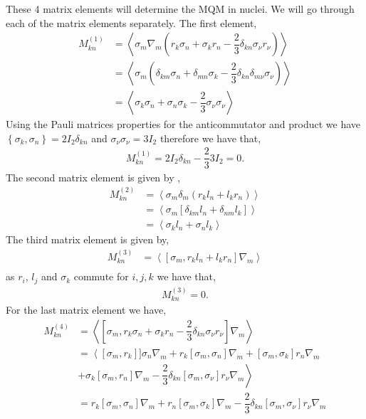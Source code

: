 \documentclass[10pt,a4paper, twoside]{report}
\begin{document}
These 4 matrix elements will determine the MQM in nuclei. We will go through each of the matrix elements separately. The first element,
\begin{align*}
M^{(1)}_{kn} &= \left<\sigma_m\nabla_m\left(r_k\sigma_n + \sigma_kr_n - \dfrac{2}{3}\delta_{kn}\sigma_\nu r_\nu\right)\right> \\
&= \left<\sigma_m\left(\delta_{km}\sigma_{n} + \delta_{mn}\sigma_k - \dfrac{2}{3}\delta_{kn}\delta_{m\nu}\sigma_{\nu}\right)\right> \\
&= \left<\sigma_k\sigma_n + \sigma_n\sigma_k - \dfrac{2}{3}\sigma_{\nu}\sigma_{\nu} \right>
\end{align*}
Using the Pauli matrices properties for the anticommutator and product we have $\left\{\sigma_k, \sigma_n\right\} = 2I_{2}\delta_{kn}$ and $\sigma_{\nu}\sigma_{\nu} = 3I_{2}$ therefore we have that,
\begin{align*}
M^{(1)}_{kn} = 2I_{2}\delta_{kn} - \dfrac{2}{3} 3I_{2} = 0.
\end{align*}
The second matrix element is given by ,
\begin{align*}
M^{(2)}_{kn} &= \left<\sigma_m\delta_m\left(r_kl_n + l_kr_n\right)\right> \\
 &= \left<\sigma_m \left[\delta_{km}l_n + \delta_{nm}l_k\right]\right> \\
&= \left<\sigma_k l_n + \sigma_nl_k\right>
\end{align*}
The third matrix element is given by,
\begin{align*}
M^{(3)}_{kn} &= \left<\left[\sigma_m, r_kl_n + l_kr_n\right]\nabla_m\right> \\
\end{align*}
as $r_i$, $l_{j}$ and $\sigma_k$ commute for $i,j,k$ we have that,
\begin{align*}
M^{(3)}_{kn} = 0.
\end{align*}
For the last matrix element we have,
\begin{align*}
M^{(4)}_{kn} &= \left<\left[\sigma_m, r_k\sigma_n + \sigma_kr_n - \dfrac{2}{3}\delta_{kn}\sigma_{\nu}r_{\nu}\right] \nabla_m\right> \\
&= \left< \left[\sigma_m,r_k\right]]\sigma_n\nabla_m + r_k\left[\sigma_m,\sigma_n\right]\nabla_m + \left[\sigma_m,\sigma_k\right]r_n\nabla_m \right. \\ 
&\left. + \sigma_k\left[\sigma_m,r_n\right]\nabla_m - \dfrac{2}{3}\delta_{kn}\left[\sigma_m,\sigma_{\nu}\right]r_{\nu}\nabla_m\right> \\
&= r_k\left[\sigma_m,\sigma_n\right]\nabla_m + r_n \left[\sigma_m,\sigma_k\right]\nabla_m - \dfrac{2}{3}\delta_{kn}\left[\sigma_m,\sigma_{\nu}\right]r_{\nu}\nabla_{m}
\end{align*}
\end{document}

